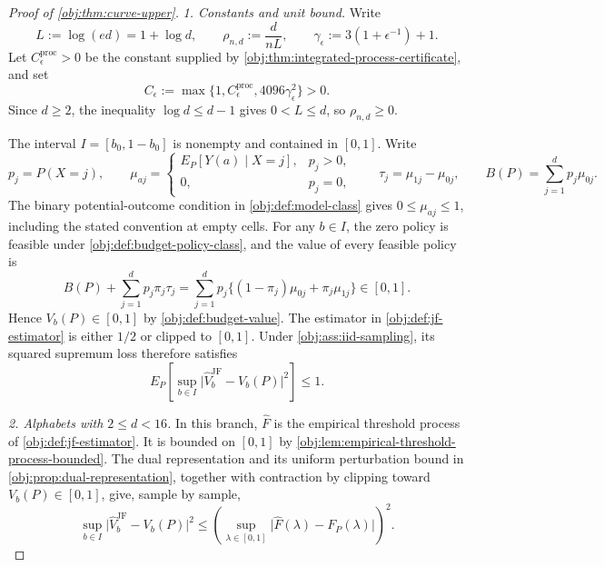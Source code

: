 \documentclass[11pt]{article}
\begin{document}
\begin{proof}[Proof of \cref{obj:thm:curve-upper}]
\textit{1. Constants and unit bound.} Write
\[
L:=\log(ed)=1+\log d,\qquad
\rho_{n,d}:=\frac{d}{nL},\qquad
\gamma_\epsilon:=3(1+\epsilon^{-1})+1.
\]
Let \(C_\epsilon^{\mathrm{proc}}>0\) be the constant supplied by \cref{obj:thm:integrated-process-certificate}, and set
\[
C_\epsilon:=\max\{1,C_\epsilon^{\mathrm{proc}},4096\gamma_\epsilon^2\}>0.
\]
Since \(d\ge2\), the inequality \(\log d\le d-1\) gives \(0<L\le d\), so \(\rho_{n,d}\ge0\).

The interval \(I=[b_0,1-b_0]\) is nonempty and contained in \([0,1]\). Write
\[
p_j=P(X=j),\qquad
\mu_{aj}=\begin{cases}E_P[Y(a)\mid X=j],&p_j>0,\\0,&p_j=0,\end{cases}
\qquad
\tau_j=\mu_{1j}-\mu_{0j},\qquad
B(P)=\sum_{j=1}^d p_j\mu_{0j}.
\]
The binary potential-outcome condition in \cref{obj:def:model-class} gives \(0\le\mu_{aj}\le1\), including the stated convention at empty cells. For any \(b\in I\), the zero policy is feasible under \cref{obj:def:budget-policy-class}, and the value of every feasible policy is
\[
B(P)+\sum_{j=1}^d p_j\pi_j\tau_j
=\sum_{j=1}^d p_j\bigl\{(1-\pi_j)\mu_{0j}+\pi_j\mu_{1j}\bigr\}\in[0,1].
\]
Hence \(V_b(P)\in[0,1]\) by \cref{obj:def:budget-value}. The estimator in \cref{obj:def:jf-estimator} is either \(1/2\) or clipped to \([0,1]\). Under \cref{obj:ass:iid-sampling}, its squared supremum loss therefore satisfies
\[
E_P\!\left[\sup_{b\in I}
 \bigl|\widehat V_b^{\mathrm{JF}}-V_b(P)\bigr|^2\right]\le1.
\]

\textit{2. Alphabets with \(2\le d<16\).} In this branch, \(\widehat F\) is the empirical threshold process of \cref{obj:def:jf-estimator}. It is bounded on \([0,1]\) by \cref{obj:lem:empirical-threshold-process-bounded}. The dual representation and its uniform perturbation bound in \cref{obj:prop:dual-representation}, together with contraction by clipping toward \(V_b(P)\in[0,1]\), give, sample by sample,
\[
\sup_{b\in I}
 \bigl|\widehat V_b^{\mathrm{JF}}-V_b(P)\bigr|^2
\le
\left(\sup_{\lambda\in[0,1]}
 \bigl|\widehat F(\lambda)-F_P(\lambda)\bigr|\right)^2.
\]


\end{proof}
\end{document}
